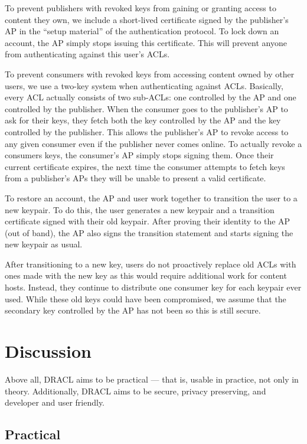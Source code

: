 \documentclass[pdftex,12pt,a4papaer]{report}
\begin{document}
To prevent publishers with revoked keys from gaining or granting access to
content they own, we include a short-lived certificate signed by the publisher's
AP in the ``setup material'' of the authentication protocol. To lock down an
account, the AP simply stops issuing this certificate. This will prevent anyone
from authenticating against this user's ACLs.

To prevent consumers with revoked keys from accessing content owned by other
users, we use a two-key system when authenticating against ACLs. Basically,
every ACL actually consists of two sub-ACLs: one controlled by the AP and one
controlled by the publisher. When the consumer goes to the publisher's AP to ask
for their keys, they fetch both the key controlled by the AP and the key
controlled by the publisher. This allows the publisher's AP to revoke access to
any given consumer even if the publisher never comes online. To actually revoke
a consumers keys, the consumer's AP simply stops signing them. Once their
current certificate expires, the next time the consumer attempts to fetch keys
from a publisher's APs they will be unable to present a valid certificate.

To restore an account, the AP and user work together to transition the user to a
new keypair. To do this, the user generates a new keypair and a transition
certificate signed with their old keypair. After proving their identity to the
AP (out of band), the AP also signs the transition statement and starts signing
the new keypair as usual.

After transitioning to a new key, users do not proactively replace old ACLs with
ones made with the new key as this would require additional work for content
hosts. Instead, they continue to distribute one consumer key for each keypair
ever used. While these old keys could have been compromised, we assume that the
secondary key controlled by the AP has not been so this is still secure.

\chapter{Discussion}

Above all, DRACL aims to be practical --- that is, usable in practice, not only
in theory. Additionally, DRACL aims to be secure, privacy preserving, and
developer and user friendly.

\section{Practical}
\end{document}
